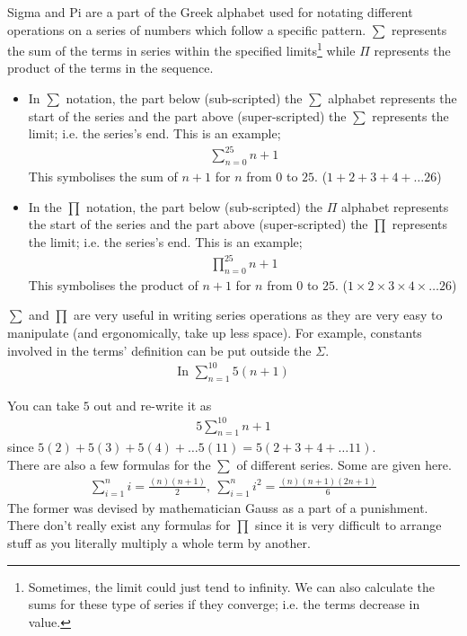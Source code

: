 \begin{mathbox}{}
{Sigma and Pi are a part of the Greek alphabet used for notating different operations on a series of numbers which follow a specific pattern. $\sum$ represents the sum of the terms in series within the specified limits\footnote{Sometimes, the limit could just tend to infinity. We can also calculate the sums for these type of series if they converge; i.e. the terms decrease in value.} while $\Pi$ represents the product of the terms in the sequence.
\begin{itemize}
    \item{In $\sum$ notation, the part below (sub-scripted) the $\sum$ alphabet represents the start of the series and the part above (super-scripted) the $\sum$ represents the limit; i.e. the series's end. This is an example;
    \begin{align*}
    \displaystyle \sum^{25}_{n=0} n+1    
    \end{align*}
    This symbolises the sum of $n+1$ for $n$ from $0$ to $25$. ($1 + 2 + 3 + 4 + \dots 26$)}
    \item{In the $\prod$ notation, the part below (sub-scripted) the $\Pi$ alphabet represents the start of the series and the part above (super-scripted) the $\prod$ represents the limit; i.e. the series's end. This is an example;
    \begin{align*}
    \displaystyle \prod^{25}_{n=0} n+1    
    \end{align*}
    This symbolises the product of $n+1$ for $n$ from $0$ to $25$. ($1 \times 2 \times 3 \times 4 \times \dots 26$)}
\end{itemize}
$\sum$ and $\prod$ are very useful in writing series operations as they are very easy to manipulate (and ergonomically, take up less space).
For example, constants involved in the terms' definition can be put outside the $\Sigma$. 
\begin{align*}
    \text{In } \displaystyle \sum^{10}_{n=1} 5(n+1)
\end{align*}}
You can take $5$ out and re-write it as
\begin{align*}
    5 \displaystyle \sum^{10}_{n=1} n+1
\end{align*}
since $5(2) + 5(3) + 5(4) + \dots 5(11) = 5(2 + 3 + 4 + \dots 11)$.\\
There are also a few formulas for the $\sum$ of different series. Some are given here.
\begin{align*}
    \displaystyle \sum^{n}_{i=1} i = \frac{(n)(n+1)}{2},~
    \displaystyle \sum^{n}_{i=1} i^2 = \frac{(n)(n+1)(2n+1)}{6}
\end{align*}
The former was devised by mathematician Gauss as a part of a punishment. There don't really exist any formulas for $\prod$ since it is very difficult to arrange stuff as you literally multiply a whole term by another.
\end{mathbox}
